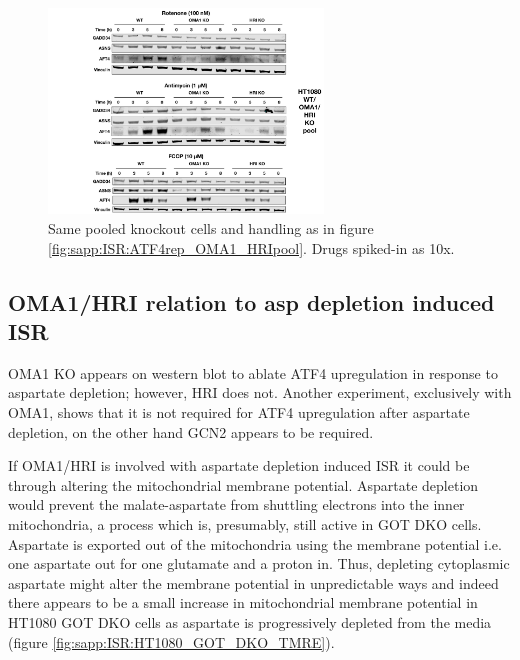\begin{figure}[t]
    \centering
    \includegraphics[width=0.65\textwidth]{figures/sapp/ISR/ATF4wes_OMA1_HRIpool.pdf}
    \caption[ATF4 post mito inhib. OMA1/HRI KO, western]{
    Same pooled knockout cells and handling as in figure \ref{fig:sapp:ISR:ATF4rep_OMA1_HRIpool}.
    Drugs spiked-in as 10x.
    }
    \label{fig:sapp:ISR:ATF4wes_OMA1_HRIpool}
\end{figure}






\FloatBarrier
\subsection{OMA1/HRI relation to asp depletion induced ISR}
OMA1 KO appears on western blot to ablate ATF4 upregulation in response to aspartate depletion; however, HRI does not.
Another experiment, exclusively with OMA1, shows that it is not required for ATF4 upregulation after aspartate depletion, on the other hand GCN2 appears to be required.

If OMA1/HRI is involved with aspartate depletion induced ISR it could be through altering the mitochondrial membrane potential.
Aspartate depletion would prevent the malate-aspartate from shuttling electrons into the inner mitochondria, a process which is, presumably, still active in GOT DKO cells.
Aspartate is exported out of the mitochondria using the membrane potential i.e. one aspartate out for one glutamate and a proton in.
Thus, depleting cytoplasmic aspartate might alter the membrane potential in unpredictable ways and indeed there appears to be a small increase in mitochondrial membrane potential in HT1080 GOT DKO cells as aspartate is progressively depleted from the media (figure \ref{fig:sapp:ISR:HT1080_GOT_DKO_TMRE}).

